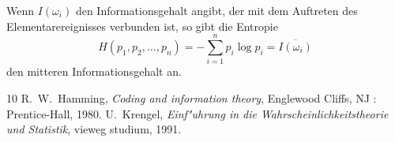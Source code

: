 \documentclass[10pt]{article}
\begin{document}
Wenn $I(\omega_i)$ den Informationsgehalt angibt, der mit dem Auftreten des
Elementarereignisses verbunden ist, so gibt die Entropie
$$ H(p_1, p_2, \ldots, p_n)=-\sum_{i=1}^n p_i \log p_i = 
   \overline{I(\omega_i)} $$
den mitteren Informationsgehalt an.
\begin{thebibliography}{10}
  R.~W.~Hamming,
  \emph{Coding and information theory},
  Englewood Cliffs, NJ : Prentice-Hall, 1980.
  U.~Krengel,
  \emph{Einf"uhrung in die Wahrscheinlichkeitstheorie und Statistik},
  vieweg studium,
  1991.
\end{thebibliography}
\end{document}
